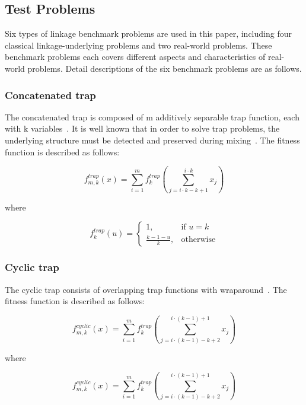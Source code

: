 \documentclass{sig-alternate-05-2015}
\begin{document}
\subsection{Test Problems}
Six types of linkage benchmark problems are used in this paper, including four classical linkage-underlying problems and two real-world problems. These benchmark problems each covers different aspects and characteristics of real-world problems. Detail descriptions of the six benchmark problems are as follows.


\subsubsection{Concatenated trap}
The concatenated trap is composed of m additively separable trap function, each with k variables~\cite{goldberg:deception}. It is well known that in order to solve trap problems, the underlying structure must be detected and preserved during mixing~\cite{pelikan:overlap}. The fitness function is described as follows:

\begin{displaymath}
f_{m,k}^{trap}(x) = \sum_{i=1}^{m} f_{k}^{trap} \left (\sum_{j = i\cdot k-k+1}^{i\cdot k} x_j\right )
\end{displaymath}

where

\begin{displaymath}
f_{k}^{trap}(u) = 
   \begin{cases}
    1, & \text{if $u=k$} \\
    \frac{k-1-u}{k}, & \text{otherwise}
	\end{cases}
\end{displaymath}


\subsubsection{Cyclic trap}
The cyclic trap consists of overlapping trap functions with wraparound~\cite{yu:overlapping}. The fitness function is described as follows:

\begin{displaymath}
f_{m,k}^{cyclic}(x) = \sum_{i=1}^{m} f_{k}^{trap} \left (\sum_{j = i\cdot(k-1)-k+2}^{i\cdot(k-1)+1} x_j\right )
\end{displaymath}

where

\begin{displaymath}
f_{m,k}^{cyclic}(x) = \sum_{i=1}^{m} f_{k}^{trap} \left (\sum_{j = i\cdot(k-1)-k+2}^{i\cdot(k-1)+1} x_j\right )
\end{displaymath}
\end{document}
